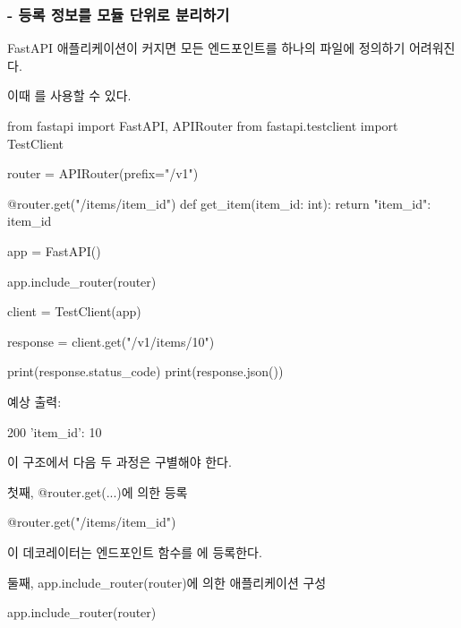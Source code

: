 \subsubsection{ - 등록 정보를 모듈 단위로 분리하기}

FastAPI 애플리케이션이 커지면 모든 엔드포인트를 하나의 파일에 정의하기 어려워진다.

이때 를 사용할 수 있다.

\begin{dhkcode}
from fastapi import FastAPI, APIRouter
from fastapi.testclient import TestClient


router = APIRouter(prefix="/v1")


@router.get("/items/{item_id}")
def get_item(item_id: int):
    return {"item_id": item_id}


app = FastAPI()

app.include_router(router)


client = TestClient(app)

response = client.get("/v1/items/10")

print(response.status_code)
print(response.json())
\end{dhkcode}

예상 출력:

\begin{dhkzsh}
200
{'item_id': 10}
\end{dhkzsh}

이 구조에서 다음 두 과정은 구별해야 한다.

\begin{dhknote}
\begin{dhksmry}[centered]
첫째, @router.get(...)에 의한 등록
\end{dhksmry}
\end{dhknote}

\begin{dhkcode}
@router.get("/items/{item_id}")
\end{dhkcode}

이 데코레이터는 엔드포인트 함수를 에 등록한다.

\begin{dhknote}
\begin{dhksmry}[centered]
둘째, app.include_router(router)에 의한 애플리케이션 구성
\end{dhksmry}
\end{dhknote}

\begin{dhkcode}
app.include_router(router)
\end{dhkcode}


